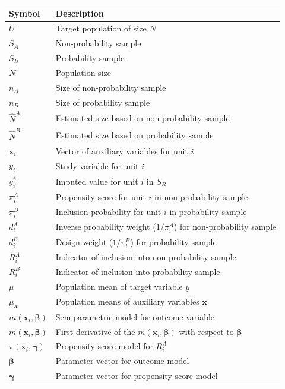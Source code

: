 \documentclass[
]{jss}
\begin{document}
\begin{table}[ht!]
\centering
\begin{tabular}{ll}
\hline
\textbf{Symbol} & \textbf{Description} \\
\hline
$U$ & Target population of size $N$ \\
$S_A$ & Non-probability sample \\
$S_B$ & Probability sample \\
$N$ & Population size \\
$n_A$ & Size of non-probability sample \\
$n_B$ & Size of probability sample \\
$\hat{N}^A$ & Estimated size based on non-probability sample \\
$\hat{N}^B$ & Estimated size based on probability sample \\
$\boldsymbol{x}_i$ & Vector of auxiliary variables for unit $i$ \\
$y_i$ & Study variable for unit $i$ \\
$y_i^*$ & Imputed value for unit $i$ in $S_B$\\
$\pi_i^A$ & Propensity score for unit $i$ in non-probability sample \\
$\pi_i^B$ & Inclusion probability for unit $i$ in probability sample \\
$d_i^A$ & Inverse probability weight ($1/\pi_i^A$) for non-probability sample \\
$d_i^B$ & Design weight ($1/\pi_i^B$) for probability sample \\
$R_i^A$ & Indicator of inclusion into non-probability sample \\
$R_i^B$ & Indicator of inclusion into probability sample \\
$\mu$ & Population mean of target variable $y$ \\
$\mu_{\boldsymbol{x}}$ & Population means of auxiliary variables $\boldsymbol{x}$ \\
$m(\boldsymbol{x}_i, \boldsymbol{\beta})$ & Semiparametric model for outcome variable \\
$\dot{m}(\boldsymbol{x}_i, \boldsymbol{\beta})$ & First derivative of the $m(\boldsymbol{x}_i, \boldsymbol{\beta})$ with respect to $\boldsymbol{\beta}$ \\
$\pi(\boldsymbol{x}_i, \boldsymbol{\gamma})$ & Propensity score model for $R_i^A$ \\
$\boldsymbol{\beta}$ & Parameter vector for outcome model \\
$\boldsymbol{\gamma}$ & Parameter vector for propensity score model \\

\end{tabular}
\end{table}
\end{document}
